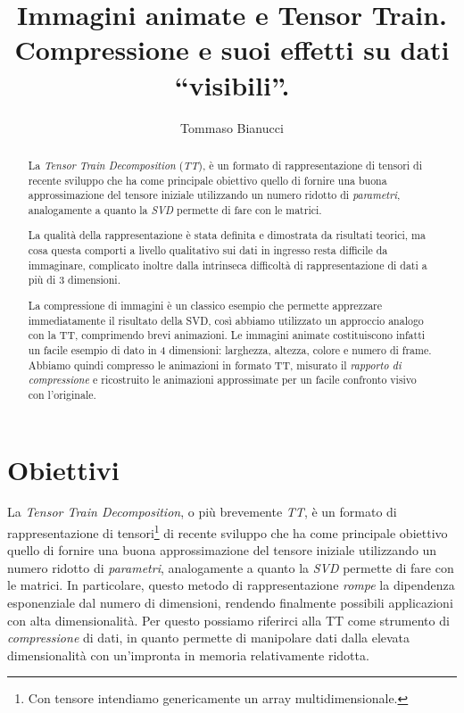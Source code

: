 \documentclass[11pt,a4paper]{article}
\title{Immagini animate e Tensor Train.\\Compressione e suoi effetti su dati ``visibili''.}
\author{Tommaso Bianucci}
\begin{document}
\maketitle

\begin{abstract}
  La \emph{Tensor Train Decomposition} (\emph{TT}), è un formato di rappresentazione di tensori di recente sviluppo che ha come principale obiettivo quello di fornire una buona approssimazione del tensore iniziale utilizzando un numero ridotto di \emph{parametri}, analogamente a quanto la \emph{SVD} permette di fare con le matrici.


  La qualità della rappresentazione è stata definita e dimostrata da risultati teorici, ma cosa questa comporti a livello qualitativo sui dati in ingresso resta difficile da immaginare, complicato inoltre dalla intrinseca difficoltà di rappresentazione di dati a più di 3 dimensioni.

  La compressione di immagini è un classico esempio che permette apprezzare immediatamente il risultato della SVD, così abbiamo utilizzato un approccio analogo con la TT, comprimendo brevi animazioni.
  Le immagini animate costituiscono infatti un facile esempio di dato in 4 dimensioni: larghezza, altezza, colore e numero di frame.
  Abbiamo quindi compresso le animazioni in formato TT, misurato il \emph{rapporto di compressione} e ricostruito le animazioni approssimate per un facile confronto visivo con l'originale. 
\end{abstract}

\tableofcontents

\section{Obiettivi}
La \emph{Tensor Train Decomposition}, o più brevemente \emph{TT}, è un formato di rappresentazione di tensori\footnote{Con tensore intendiamo genericamente un array multidimensionale.} di recente sviluppo che ha come principale obiettivo quello di fornire una buona approssimazione del tensore iniziale utilizzando un numero ridotto di \emph{parametri}, analogamente a quanto la \emph{SVD} permette di fare con le matrici.
In particolare, questo metodo di rappresentazione \emph{rompe} la dipendenza esponenziale dal numero di dimensioni, rendendo finalmente possibili applicazioni con alta dimensionalità.
Per questo possiamo riferirci alla TT come strumento di \emph{compressione} di dati, in quanto permette di manipolare dati dalla elevata dimensionalità con un'impronta in memoria relativamente ridotta.
\end{document}
